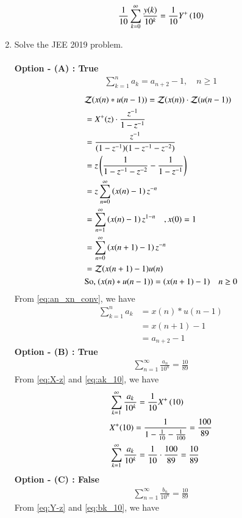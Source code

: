 \documentclass[journal,12pt,twocolumn]{IEEEtran}
\renewcommand\thesection{\arabic{section}}
\begin{document}
\begin{enumerate}[label=\thesection.\arabic*,ref=\thesection.\theenumi]
\begin{align}
	\frac{1}{10}\sum_{k=0}^{\infty}\frac{y(k)}{10^k} = \frac{1}{10}Y^{+}\left({10}\right)
	\label{eq:bk_10}
\end{align}
\item Solve the JEE 2019 problem. \\
\solution \\
\textbf{Option - (A) : True}
\begin{align}
	\sum_{k=1}^{n}a_k = a_{n+2}-1, \quad n \ge 1
\end{align}
\begin{align}
	&\mathcal{Z}(x(n)*u(n-1)) = \mathcal{Z}(x(n)) \cdot \mathcal{Z}(u(n-1)) \\
	&= X^+ (z) \cdot \frac{z^{-1}}{1-z^{-1}} \\
	&= \frac{z^{-1}}{(1 - z^{-1})(1 - z^{-1} - z^{-2})} \\
	&= z \left(\frac{1}{1 - z^{-1} - z^{-2}} -\frac{1}{1 - z^{-1}}\right) \\
	&= z \sum_{n = 0}^{\infty} \left(x(n) - 1\right) z^{-n} \\
	&= \sum_{n = 1}^{\infty} \left(x(n) - 1\right) z^{1-n} \quad ,x(0) = 1 \\
	&= \sum_{n = 0}^{\infty} \left(x(n+1) - 1\right) z^{-n} \\
	&= \mathcal{Z}(x(n+1) - 1)u(n) \\
	&\text{So, } (x(n)*u(n-1)) = (x(n+1) - 1) \quad n \geq 0
\end{align} 
From \eqref{eq:an_xn_conv}, we have 
\begin{align}
	\sum_{k=1}^{n}a_k &= x(n) * u(n-1) \\
	&= x(n+1) - 1 \\
	&= a_{n+2} - 1
\end{align}
\textbf{Option - (B) : True}
\begin{align}
	\sum_{n=1}^{\infty} \frac{a_n}{10^n} = \frac{10}{89}
\end{align}
From \eqref{eq:X-z} and \eqref{eq:ak_10}, we have
\begin{align}
	&\sum_{k=1}^{\infty}\frac{a_k}{10^k} = \frac{1}{10}X^{+}\left({10}\right) \\
	&X^+(10) = \frac{1}{1 - \frac{1}{10} - \frac{1}{100}} = \frac{100}{89} \\
	&\sum_{k=1}^{\infty}\frac{a_k}{10^k} = \frac{1}{10} \cdot \frac{100}{89} = \frac{10}{89}
\end{align}
\textbf{Option - (C) : False}
\begin{align}
	\sum_{n=1}^{\infty} \frac{b_n}{10^n} = \frac{10}{89}
\end{align}
From \eqref{eq:Y-z} and \eqref{eq:bk_10}, we have

\end{enumerate}
\end{document}
